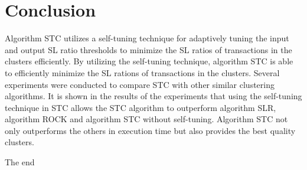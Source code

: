 \documentclass[11pt,reqno]{amsart}
\theoremstyle{definition}
\numberwithin{equation}{subsection}
\begin{document}
\section{Conclusion}

Algorithm STC utilizes a self-tuning technique for adaptively tuning the input and output SL ratio thresholds to minimize the SL ratios of transactions in the clusters efficiently. By utilizing the self-tuning technique, algorithm STC is able to efficiently minimize the SL rations of transactions in the clusters. Several experiments were conducted to compare STC with other similar clustering algorithms.  It is shown in the results of the experiments that using the self-tuning technique in STC allows the STC algorithm to outperform algorithm SLR, algorithm ROCK and algorithm STC without self-tuning. Algorithm STC not only outperforms the others in execution time but also provides the best quality clusters.

The end
\end{document}
